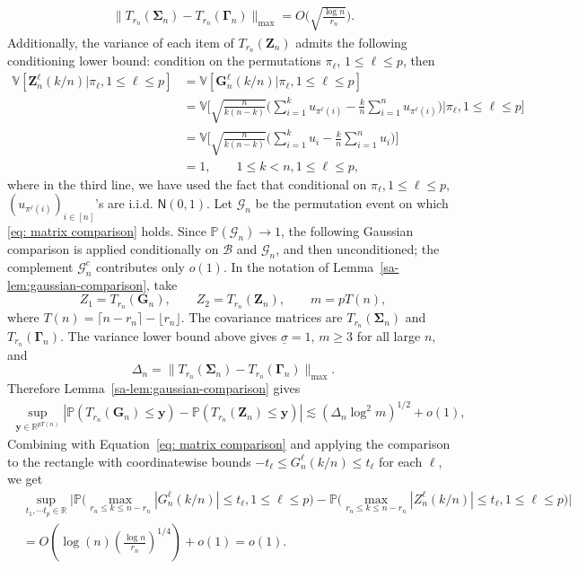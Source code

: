 \documentclass[10pt]{article}
\def\bG{\mathbf{G}}
\def\bZ{\mathbf{Z}}
\def\bSigma{\boldsymbol{\Sigma}}
\def\bGamma{\boldsymbol{\Gamma}}
\def\P{\mathbb{P}}
\def\V{\mathbb{V}}
\def\reals{\mathbb{R}}
\theoremstyle{definition}
\theoremstyle{remark}
\begin{document}
\begin{align}\label{eq: matrix comparison}
    \lVert {T_{r_n}(\bSigma_n) - T_{r_n}(\bGamma_n)}\rVert_{\operatorname{max}} = O\bigg(\sqrt{\frac{\log n}{r_n}}\bigg).
\end{align}
Additionally, the variance of each item of $T_{r_n}(\mathbf{Z}_n)$ admits the following conditioning lower bound: condition on the permutations $\pi_\ell$, $1 \leq \ell \leq p$, then
\begin{align*}
    \V[\mathbf{Z}_n^\ell(k/n)|\pi_\ell, 1 \leq \ell \leq p]
    & = \V[\mathbf{G}_n^\ell(k/n)|\pi_\ell, 1 \leq \ell \leq p] \\
    & = \V\bigg[\sqrt{\frac{n}{k(n - k)}} \Big(\sum_{i = 1}^k u_{\pi^\ell(i)} - \frac{k}{n} \sum_{i = 1}^n u_{\pi^\ell(i)}\Big)\bigg|\pi_\ell, 1 \leq \ell \leq p\bigg] \\
    & = \V\bigg[\sqrt{\frac{n}{k(n - k)}} \Big(\sum_{i = 1}^k u_i - \frac{k}{n} \sum_{i = 1}^n u_i\Big)\bigg] \\
    & = 1, \qquad 1 \leq k < n, 1 \leq \ell \leq p,
\end{align*}
where in the third line, we have used the fact that conditional on $\pi_\ell, 1 \leq \ell \leq p$, $(u_{\pi^\ell(i)})_{i \in [n]}$'s are i.i.d. $\mathsf{N}(0,1)$. Let $\mathcal{G}_n$ be the permutation event on which \eqref{eq: matrix comparison} holds. Since $\P(\mathcal{G}_n)\to1$, the following Gaussian comparison is applied conditionally on $\mathscr{B}$ and $\mathcal{G}_n$, and then unconditioned; the complement $\mathcal{G}_n^c$ contributes only $o(1)$. In the notation of Lemma~\ref{sa-lem:gaussian-comparison}, take
\[
    Z_1=T_{r_n}(\bG_n),\qquad
    Z_2=T_{r_n}(\bZ_n),\qquad
    m=pT(n),
\]
where $T(n) = \lceil n - r_n \rceil - \lfloor r_n \rfloor$. The covariance matrices are $T_{r_n}(\bSigma_n)$ and $T_{r_n}(\bGamma_n)$. The variance lower bound above gives $\underline{\sigma}=1$, $m\geq3$ for all large $n$, and
\[
    \Delta_n=\lVert {T_{r_n}(\bSigma_n)-T_{r_n}(\bGamma_n)}\rVert_{\operatorname{max}}.
\]
Therefore Lemma~\ref{sa-lem:gaussian-comparison} gives
\begin{align*}
    \sup_{\mathbf{y} \in \reals^{p T(n)}} |\P(T_{r_n}(\bG_n) \leq \mathbf{y}) - \P(T_{r_n}(\bZ_n) \leq \mathbf{y})|
    \lesssim (\Delta_n\log^2 m)^{1/2}+o(1),
\end{align*}
Combining with Equation~\eqref{eq: matrix comparison} and applying the comparison to the rectangle with coordinatewise bounds $-t_\ell \leq G_n^\ell(k/n)\leq t_\ell$ for each $\ell$, we get
\begin{align}\label{eq: approax}
    \nonumber & \sup_{t_1, \cdots t_p \in \reals}\Big|\P\Big(\max_{r_n \leq k \leq n - r_n} |G_n^\ell(k/n)| \leq t_\ell, 1 \leq \ell \leq p\Big) - \P\Big(\max_{r_n \leq k \leq n - r_n} 
    |Z_n^\ell(k/n)| \leq t_\ell, 1 \leq \ell \leq p\Big)\Big| \\
    & = O\!\left(\log(n)\left(\frac{\log n}{r_n}\right)^{1/4}\right)+o(1)=o(1).
\end{align}
\end{document}
